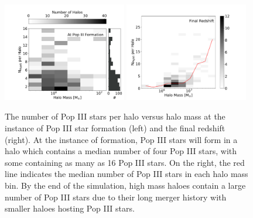 \documentclass[fleqn,usenatbib]{mnras}
\begin{document}
\begin{figure}
  \centering
  \includegraphics[width=0.48\textwidth]{images/totnump3_halomass_sidehist.pdf}
  \hfill
  \includegraphics[width=0.48\textwidth]{images/final_redshift_Np3_mass.pdf}
  \caption{The number of Pop III stars per halo versus halo mass at the instance of Pop III star formation (left) and the final redshift (right). At the instance of formation, Pop III stars will form in a halo which contains a median number of four Pop III stars, with some containing as many as 16 Pop III stars. On the right, the red line indicates the median number of Pop III stars in each halo mass bin. By the end of the simulation, high mass haloes contain a large number of Pop III stars due to their long merger history with smaller haloes hosting Pop III stars.}
  \label{fig:num_p3}
\end{figure}
\end{document}
